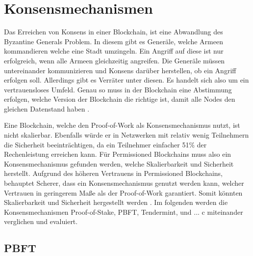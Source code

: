 \label{subsec:eval-konsens}
\section{Konsensmechanismen}
Das Erreichen von Konsens in einer Blockchain, ist eine Abwandlung des Byzantine Generals Problem. In diesem gibt es Generäle, welche Armeen kommandieren welche eine Stadt umzingeln. Ein Angriff auf diese ist nur erfolgreich, wenn alle Armeen gleichzeitig angreifen. Die Generäle müssen untereinander kommunizieren und Konsens darüber herstellen, ob ein Angriff erfolgen soll. Allerdings gibt es Verräter unter diesen. Es handelt sich also um ein vertrauensloses Umfeld. Genau so muss in der Blockchain eine Abstimmung erfolgen, welche Version der Blockchain die richtige ist, damit alle Nodes den gleichen Datenstand haben \cite{ZhengBlockchainChallengesOpportunities2017}.

Eine Blockchain, welche den Proof-of-Work als Konsensmechanismus nutzt, ist nicht skalierbar. Ebenfalls würde er in Netzwerken mit relativ wenig Teilnehmern die Sicherheit beeinträchtigen, da ein Teilnehmer einfacher 51\% der Rechenleistung erreichen kann. Für Permissioned Blockchains muss also ein Konsensmechanismus gefunden werden, welche Skalierbarkeit und Sicherheit herstellt. Aufgrund des höheren Vertrauens in Permissioned Blockchains, behauptet Scherer, dass ein Konsensmechanismus genutzt werden kann, welcher Vertrauen in geringerem Maße als der Proof-of-Work garantiert. Somit könnten Skalierbarkeit und Sicherheit hergestellt werden \cite{SchererPerformanceScalabilityBlockchain2017}. Im folgenden werden die Konsensmechanismen Proof-of-Stake, PBFT, Tendermint, und ... c miteinander verglichen und evaluiert.


\subsection{PBFT}



